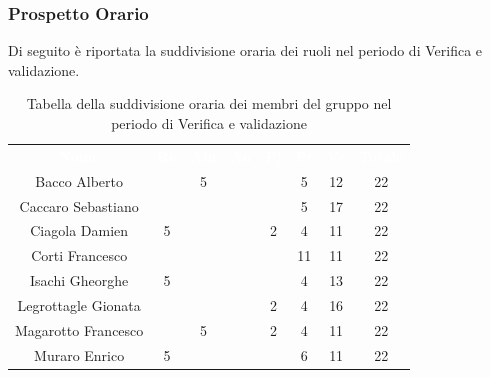 \subsubsection{Prospetto Orario}
Di seguito è riportata la suddivisione oraria dei ruoli nel periodo di Verifica e validazione.




\begin{table}[H]	
	\begin{center}
	    \begin{tabular}{cccccccc}
			\rowcolor{greySWEight}
			\textcolor{white}{\textbf{Nome}} & \textcolor{white}{\textbf{Re}} & \textcolor{white}{\textbf{Am}} & \textcolor{white}{\textbf{An}} & \textcolor{white}{\textbf{Pj}} & \textcolor{white}{\textbf{Pr}} & \textcolor{white}{\textbf{Ve}} & \textcolor{white}{\textbf{Totale}}
			\\
			Bacco Alberto & & 5 & & & 5 & 12 & 22 \\
			Caccaro Sebastiano & & & & & 5 & 17 & 22 \\
			Ciagola Damien & 5 & & & 2 & 4 & 11 & 22 \\
			Corti Francesco & & & & & 11 & 11 & 22 \\
			Isachi Gheorghe & 5 & & & & 4 & 13 & 22 \\
			Legrottagle Gionata & & & & 2 & 4 & 16 & 22 \\
			Magarotto Francesco & & 5 & & 2 & 4 & 11 & 22 \\
			Muraro Enrico & 5 & & & & 6 & 11 & 22 \\
			\end{tabular}
	    \caption{Tabella della suddivisione oraria dei membri del gruppo nel periodo di Verifica e validazione} \label{tab:tabellaPersoneVerifica e validazione} 
	\end{center}
\end{table}

